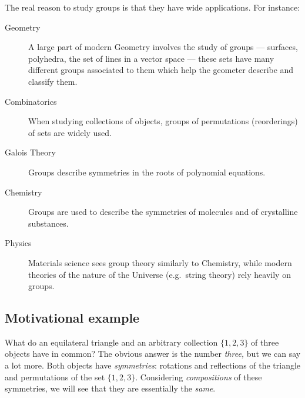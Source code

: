 The real reason to study groups is that they have wide applications. For instance:

\begin{description}
\item[Geometry] A large part of modern Geometry involves the study of groups --- surfaces, polyhedra, the set of lines in a vector space --- these sets have many different groups associated to them which help the geometer describe and classify them.
\item[Combinatorics] When studying collections of objects, groups of permutations (reorderings) of sets are widely used.
\item[Galois Theory] Groups describe symmetries in the roots of polynomial equations.
\item[Chemistry] Groups are used to describe the symmetries of molecules and of crystalline substances.
\item[Physics] Materials science sees group theory similarly to Chemistry, while modern theories of the nature of the Universe (e.g.\ string theory) rely heavily on groups.
\end{description}


\subsection*{Motivational example}\hypertarget{sec:motiv}{}

What do an equilateral triangle and an arbitrary collection $\{1,2,3\}$ of three objects have in common? The obvious answer is the number \emph{three,} but we can say a lot more. Both objects have \emph{symmetries}: rotations and reflections of the triangle and permutations of the set $\{1,2,3\}$. Considering \emph{compositions} of these symmetries, we will see that they are essentially the \emph{same}.

